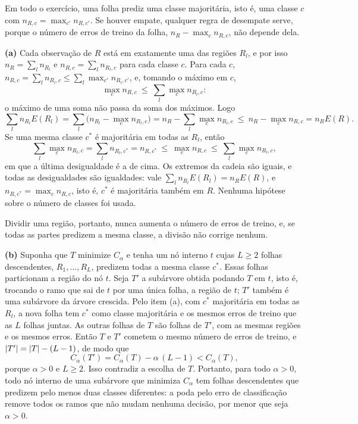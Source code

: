 \begin{solucao}
Em todo o exercício, uma folha prediz uma classe majoritária, isto é, uma classe $c$ com
$n_{R,c}=\max_{c'}n_{R,c'}$. Se houver empate, qualquer regra de desempate serve, porque o número
de erros de treino da folha, $n_R-\max_cn_{R,c}$, não depende dela.

\smallskip
\textbf{(a)} Cada observação de $R$ está em exatamente uma das regiões $R_l$, e por isso
$n_R=\sum_ln_{R_l}$ e $n_{R,c}=\sum_ln_{R_l,c}$ para cada classe $c$. Para cada $c$,
$n_{R,c}=\sum_ln_{R_l,c}\le\sum_l\max_{c'}n_{R_l,c'}$, e, tomando o máximo em $c$,
\[
  \max_cn_{R,c}\ \le\ \sum_l\max_cn_{R_l,c} :
\]
o máximo de uma soma não passa da soma dos máximos. Logo
\[
  \sum_ln_{R_l}E(R_l)=\sum_l\Big(n_{R_l}-\max_cn_{R_l,c}\Big)=n_R-\sum_l\max_cn_{R_l,c}
  \ \le\ n_R-\max_cn_{R,c}=n_RE(R).
\]
Se uma mesma classe $c^*$ é majoritária em todas as $R_l$, então
\[
  \sum_l\max_cn_{R_l,c}=\sum_ln_{R_l,c^*}=n_{R,c^*}\ \le\ \max_cn_{R,c}\ \le\ \sum_l\max_cn_{R_l,c},
\]
em que a última desigualdade é a de cima. Os extremos da cadeia são iguais, e todas as
desigualdades são igualdades: vale $\sum_ln_{R_l}E(R_l)=n_RE(R)$, e
$n_{R,c^*}=\max_cn_{R,c}$, isto é, $c^*$ é majoritária também em $R$. Nenhuma hipótese sobre o
número de classes foi usada.

Dividir uma região, portanto, nunca aumenta o número de erros de treino, e, se todas as partes
predizem a mesma classe, a divisão não corrige nenhum.

\smallskip
\textbf{(b)} Suponha que $T$ minimize $C_\alpha$ e tenha um nó interno $t$ cujas $L\ge2$ folhas
descendentes, $R_1,\dots,R_L$, predizem todas a mesma classe $c^*$. Essas folhas particionam a
região do nó $t$. Seja $T'$ a subárvore obtida podando $T$ em $t$, isto é, trocando o ramo que
sai de $t$ por uma única folha, a região de $t$; $T'$ também é uma subárvore da árvore
crescida. Pelo item (a), com $c^*$ majoritária em todas as $R_l$, a nova folha tem $c^*$ como
classe majoritária e os mesmos erros de treino que as $L$ folhas juntas. As outras folhas de $T$
são folhas de $T'$, com as mesmas regiões e os mesmos erros. Então $T$ e $T'$ cometem o mesmo
número de erros de treino, e $\left\lvert T' \right\rvert=\left\lvert T \right\rvert-(L-1)$, de modo que
\[
  C_\alpha(T')=C_\alpha(T)-\alpha\,(L-1)<C_\alpha(T),
\]
porque $\alpha>0$ e $L\ge2$. Isso contradiz a escolha de $T$. Portanto, para todo $\alpha>0$,
todo nó interno de uma subárvore que minimiza $C_\alpha$ tem folhas descendentes que predizem
pelo menos duas classes diferentes: a poda pelo erro de classificação remove todos os ramos que
não mudam nenhuma decisão, por menor que seja $\alpha>0$.


\end{solucao}
